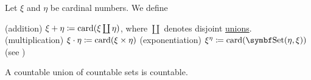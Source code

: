 \begin{definition}\label{def:cardinal_arithmetic}
  Let \( \xi \) and \( \eta \) be cardinal numbers. We define
  \begin{DefEnum}
    (addition) \( \xi + \eta \coloneqq \operatorname{card}(\xi \coprod \eta) \), where \( \coprod \) denotes disjoint \hyperref[def:disjoint_union]{unions}.
    (multiplication) \( \xi \cdot \eta \coloneqq \operatorname{card}(\xi \times \eta) \)
    (exponentiation) \( \xi^\eta \coloneqq \Card(\Cat{Set}(\eta, \xi)) \) (see )
  \end{DefEnum}
\end{definition}

\begin{proposition}\label{thm:countable_union_of_countable_sets}
  A countable union of countable sets is countable.
\end{proposition}
